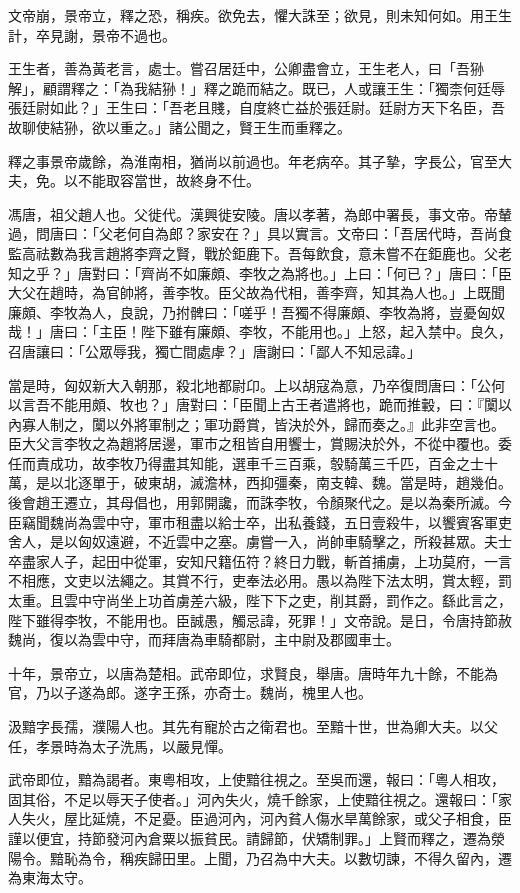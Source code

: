 \begin{pinyinscope}
文帝崩，景帝立，釋之恐，稱疾。欲免去，懼大誅至；欲見，則未知何如。用王生計，卒見謝，景帝不過也。

王生者，善為黃老言，處士。嘗召居廷中，公卿盡會立，王生老人，曰「吾狲解」，顧謂釋之：「為我結狲！」釋之跪而結之。既已，人或讓王生：「獨柰何廷辱張廷尉如此？」王生曰：「吾老且賤，自度終亡益於張廷尉。廷尉方天下名臣，吾故聊使結狲，欲以重之。」諸公聞之，賢王生而重釋之。

釋之事景帝歲餘，為淮南相，猶尚以前過也。年老病卒。其子摯，字長公，官至大夫，免。以不能取容當世，故終身不仕。

馮唐，祖父趙人也。父徙代。漢興徙安陵。唐以孝著，為郎中署長，事文帝。帝輦過，問唐曰：「父老何自為郎？家安在？」具以實言。文帝曰：「吾居代時，吾尚食監高祛數為我言趙將李齊之賢，戰於鉅鹿下。吾每飲食，意未嘗不在鉅鹿也。父老知之乎？」唐對曰：「齊尚不如廉頗、李牧之為將也。」上曰：「何已？」唐曰：「臣大父在趙時，為官帥將，善李牧。臣父故為代相，善李齊，知其為人也。」上既聞廉頗、李牧為人，良說，乃拊髀曰：「嗟乎！吾獨不得廉頗、李牧為將，豈憂匈奴哉！」唐曰：「主臣！陛下雖有廉頗、李牧，不能用也。」上怒，起入禁中。良久，召唐讓曰：「公眾辱我，獨亡間處虖？」唐謝曰：「鄙人不知忌諱。」

當是時，匈奴新大入朝那，殺北地都尉卬。上以胡寇為意，乃卒復問唐曰：「公何以言吾不能用頗、牧也？」唐對曰：「臣聞上古王者遣將也，跪而推轂，曰：『闑以內寡人制之，闑以外將軍制之；軍功爵賞，皆決於外，歸而奏之。』此非空言也。臣大父言李牧之為趙將居邊，軍市之租皆自用饗士，賞賜決於外，不從中覆也。委任而責成功，故李牧乃得盡其知能，選車千三百乘，彀騎萬三千匹，百金之士十萬，是以北逐單于，破東胡，滅澹林，西抑彊秦，南支韓、魏。當是時，趙幾伯。後會趙王遷立，其母倡也，用郭開讒，而誅李牧，令顏聚代之。是以為秦所滅。今臣竊聞魏尚為雲中守，軍市租盡以給士卒，出私養錢，五日壹殺牛，以饗賓客軍吏舍人，是以匈奴遠避，不近雲中之塞。虜嘗一入，尚帥車騎擊之，所殺甚眾。夫士卒盡家人子，起田中從軍，安知尺籍伍符？終日力戰，斬首捕虜，上功莫府，一言不相應，文吏以法繩之。其賞不行，吏奉法必用。愚以為陛下法太明，賞太輕，罰太重。且雲中守尚坐上功首虜差六級，陛下下之吏，削其爵，罰作之。繇此言之，陛下雖得李牧，不能用也。臣誠愚，觸忌諱，死罪！」文帝說。是日，令唐持節赦魏尚，復以為雲中守，而拜唐為車騎都尉，主中尉及郡國車士。

十年，景帝立，以唐為楚相。武帝即位，求賢良，舉唐。唐時年九十餘，不能為官，乃以子遂為郎。遂字王孫，亦奇士。魏尚，槐里人也。

汲黯字長孺，濮陽人也。其先有寵於古之衛君也。至黯十世，世為卿大夫。以父任，孝景時為太子洗馬，以嚴見憚。

武帝即位，黯為謁者。東粵相攻，上使黯往視之。至吳而還，報曰：「粵人相攻，固其俗，不足以辱天子使者。」河內失火，燒千餘家，上使黯往視之。還報曰：「家人失火，屋比延燒，不足憂。臣過河內，河內貧人傷水旱萬餘家，或父子相食，臣謹以便宜，持節發河內倉粟以振貧民。請歸節，伏矯制罪。」上賢而釋之，遷為滎陽令。黯恥為令，稱疾歸田里。上聞，乃召為中大夫。以數切諫，不得久留內，遷為東海太守。


\end{pinyinscope}
